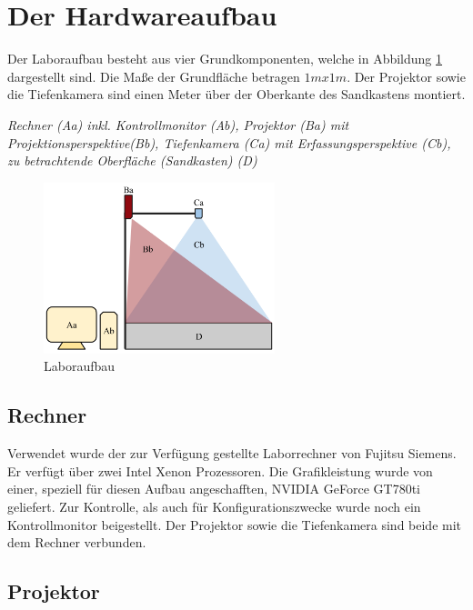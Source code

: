 \section{Der Hardwareaufbau}
\begin{Spacing}{\mylinespace}

Der Laboraufbau besteht aus vier Grundkomponenten, welche in Abbildung \ref{fig:labor} dargestellt sind. Die Maße der Grundfläche betragen $1m x 1m$. Der Projektor sowie die Tiefenkamera sind einen Meter über der Oberkante des Sandkastens montiert.

\vspace{0.2cm}
\textit{Rechner (Aa) inkl. Kontrollmonitor (Ab), Projektor (Ba) mit Projektionsperspektive(Bb), Tiefenkamera (Ca) mit Erfassungsperspektive (Cb), zu betrachtende Oberfläche (Sandkasten) (D)}

\begin{figure}[hbtp]
	\centering
	\includegraphics[width=0.6\textwidth]{graphics/Aufbau.png}
	\caption{Laboraufbau}
	\label{fig:labor}
\end{figure}

\subsection{Rechner}

Verwendet wurde der zur Verfügung gestellte Laborrechner von Fujitsu Siemens. Er verfügt über zwei Intel Xenon Prozessoren. Die Grafikleistung wurde von einer, speziell für diesen Aufbau angeschafften, NVIDIA GeForce GT780ti geliefert. Zur Kontrolle, als auch für Konfigurationszwecke wurde noch ein Kontrollmonitor beigestellt. Der Projektor sowie die Tiefenkamera sind beide mit dem Rechner verbunden.

\subsection{Projektor}


\end{Spacing}
